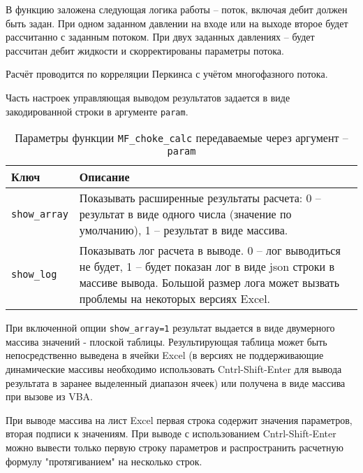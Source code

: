 В функцию заложена следующая логика работы -- поток, включая дебит должен быть задан. При одном заданном давлении на входе или на выходе второе будет рассчитанно с заданным потоком. При двух заданных давлениях -- будет рассчитан дебит жидкости и скорректированы параметры потока.

Расчёт проводится по корреляции Перкинса \cite{Perkins_1993} с учётом многофазного потока. 


Часть настроек управляющая выводом результатов задается в виде закодированной строки в аргументе \texttt{param}.

\begin{table}[H]
	\caption{Параметры функции \texttt{MF_choke_calc} передаваемые через аргумент -- \texttt{param}}
	\label{table:param_list}
	\begin{tabular}{p{}p{}}
		\hline
		Ключ & Описание  \\ \hline
		\texttt{show_array} & Показывать расширенные результаты расчета: 0 -- результат в виде одного числа (значение по умолчанию), 1 -- результат в виде массива.    \\ \hline
		
		\texttt{show_log} & Показывать лог расчета в выводе. 0 -- лог выводиться не будет, 1 -- будет показан лог в виде json строки в массиве вывода. Большой размер лога может вызвать проблемы на некоторых версиях Excel.   \\ \hline
		
		
	\end{tabular}
\end{table}
 
При включенной опции \texttt{show_array=1} результат выдается в виде двумерного массива значений - плоской таблицы. Результирующая таблица может быть непосредственно выведена в ячейки Excel (в версиях не поддерживающие динамические массивы необходимо использовать Cntrl-Shift-Enter для вывода результата в заранее выделенный диапазон ячеек) или получена в виде массива при вызове из VBA.
 
При выводе массива на лист Excel первая строка содержит значения параметров, вторая подписи к значениям. При выводе с использованием Cntrl-Shift-Enter можно вывести только первую строку параметров и распространить расчетную формулу "протягиванием" на несколько строк.
 
